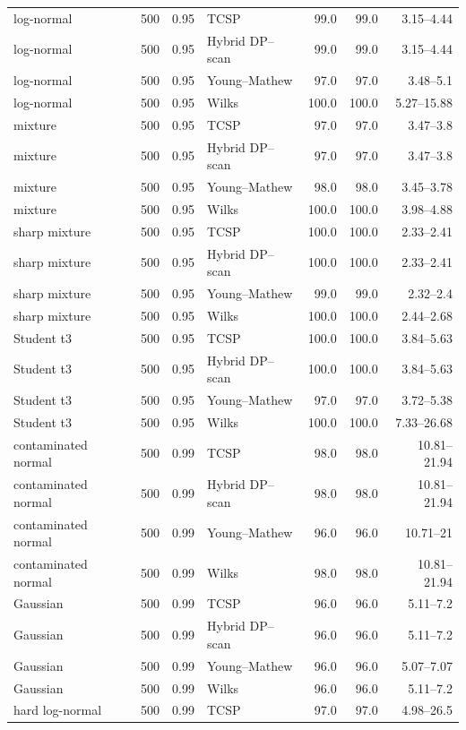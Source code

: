 \begin{longtable}{@{}p{}rrp{}rrr@{}}
log-normal & 500 & 0.95 & TCSP & 99.0 & 99.0 & 3.15--4.44 \\
log-normal & 500 & 0.95 & Hybrid DP--scan & 99.0 & 99.0 & 3.15--4.44 \\
log-normal & 500 & 0.95 & Young--Mathew & 97.0 & 97.0 & 3.48--5.1 \\
log-normal & 500 & 0.95 & Wilks & 100.0 & 100.0 & 5.27--15.88 \\
mixture & 500 & 0.95 & TCSP & 97.0 & 97.0 & 3.47--3.8 \\
mixture & 500 & 0.95 & Hybrid DP--scan & 97.0 & 97.0 & 3.47--3.8 \\
mixture & 500 & 0.95 & Young--Mathew & 98.0 & 98.0 & 3.45--3.78 \\
mixture & 500 & 0.95 & Wilks & 100.0 & 100.0 & 3.98--4.88 \\
sharp mixture & 500 & 0.95 & TCSP & 100.0 & 100.0 & 2.33--2.41 \\
sharp mixture & 500 & 0.95 & Hybrid DP--scan & 100.0 & 100.0 & 2.33--2.41 \\
sharp mixture & 500 & 0.95 & Young--Mathew & 99.0 & 99.0 & 2.32--2.4 \\
sharp mixture & 500 & 0.95 & Wilks & 100.0 & 100.0 & 2.44--2.68 \\
Student t3 & 500 & 0.95 & TCSP & 100.0 & 100.0 & 3.84--5.63 \\
Student t3 & 500 & 0.95 & Hybrid DP--scan & 100.0 & 100.0 & 3.84--5.63 \\
Student t3 & 500 & 0.95 & Young--Mathew & 97.0 & 97.0 & 3.72--5.38 \\
Student t3 & 500 & 0.95 & Wilks & 100.0 & 100.0 & 7.33--26.68 \\
contaminated normal & 500 & 0.99 & TCSP & 98.0 & 98.0 & 10.81--21.94 \\
contaminated normal & 500 & 0.99 & Hybrid DP--scan & 98.0 & 98.0 & 10.81--21.94 \\
contaminated normal & 500 & 0.99 & Young--Mathew & 96.0 & 96.0 & 10.71--21 \\
contaminated normal & 500 & 0.99 & Wilks & 98.0 & 98.0 & 10.81--21.94 \\
Gaussian & 500 & 0.99 & TCSP & 96.0 & 96.0 & 5.11--7.2 \\
Gaussian & 500 & 0.99 & Hybrid DP--scan & 96.0 & 96.0 & 5.11--7.2 \\
Gaussian & 500 & 0.99 & Young--Mathew & 96.0 & 96.0 & 5.07--7.07 \\
Gaussian & 500 & 0.99 & Wilks & 96.0 & 96.0 & 5.11--7.2 \\
hard log-normal & 500 & 0.99 & TCSP & 97.0 & 97.0 & 4.98--26.5 \\

\end{longtable}
